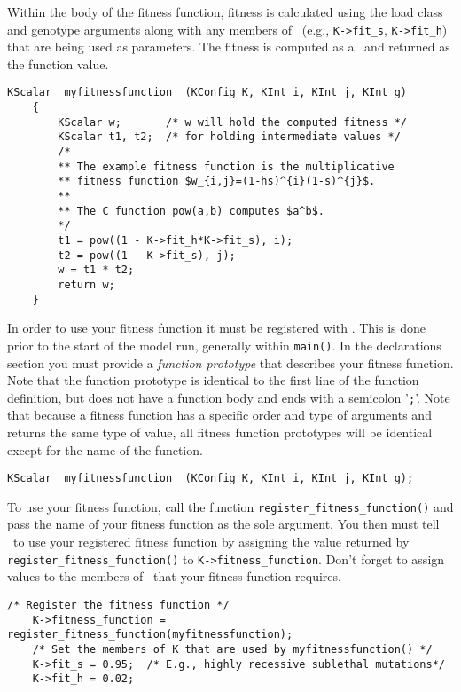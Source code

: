 Within the body of the fitness function, fitness is calculated using the load class and genotype arguments along with any members of \KK\ (e.g., \lstinline{K->fit_s}, \lstinline{K->fit_h}) that are being used as parameters.  The fitness is computed as a \KScalar\ and returned as the function value.
\begin{lstlisting}[gobble=4]
    KScalar  myfitnessfunction  (KConfig K, KInt i, KInt j, KInt g)
    {
        KScalar w;       /* w will hold the computed fitness */
        KScalar t1, t2;  /* for holding intermediate values */
        /*
        ** The example fitness function is the multiplicative
        ** fitness function $w_{i,j}=(1-hs)^{i}(1-s)^{j}$.
        **
        ** The C function pow(a,b) computes $a^b$.
        */
        t1 = pow((1 - K->fit_h*K->fit_s), i);
        t2 = pow((1 - K->fit_s), j);
        w = t1 * t2;
        return w;
    }
\end{lstlisting}
In order to use your fitness function it must be registered with \K.  This is done prior to the start of the model run, generally within \lstinline{main()}.  In the declarations section you must provide a {\em function prototype} that describes your fitness function.  Note that the function prototype is identical to the first line of the function definition, but does not have a function body and ends with a semicolon '\lstinline{;}'.    Note that because a fitness function has a specific order and type of arguments and returns the same type of value, all fitness function prototypes will be identical except for the name of the function.  
\begin{lstlisting}[gobble=4]
    KScalar  myfitnessfunction  (KConfig K, KInt i, KInt j, KInt g);
\end{lstlisting}
To use your fitness function, call the function \lstinline{register_fitness_function()} and pass the name of your fitness function as the sole argument.  You then must tell \K\ to use your registered fitness function by assigning the value returned by \lstinline{register_fitness_function()} to \lstinline{K->fitness_function}.  Don't forget to assign values to the members of \KK\ that your fitness function requires.
\begin{lstlisting}[gobble=4]
    /* Register the fitness function */
    K->fitness_function = register_fitness_function(myfitnessfunction);
    /* Set the members of K that are used by myfitnessfunction() */
    K->fit_s = 0.95;  /* E.g., highly recessive sublethal mutations*/
    K->fit_h = 0.02;
\end{lstlisting}

